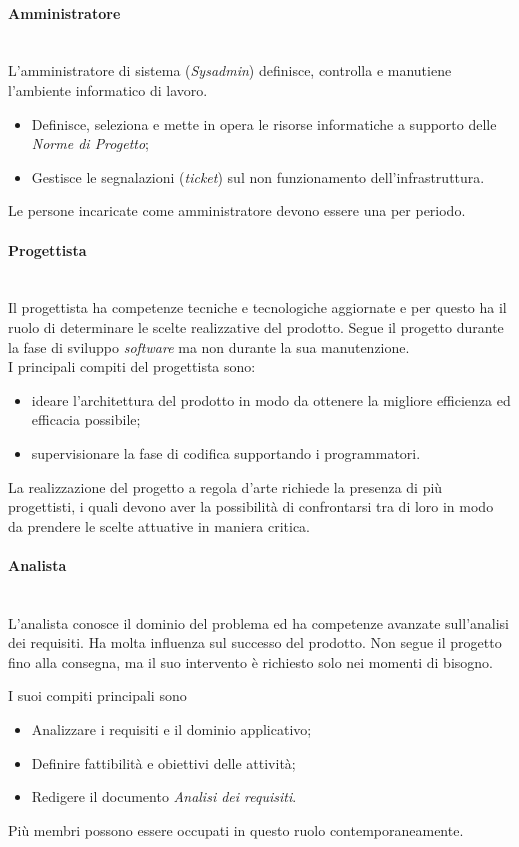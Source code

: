 \documentclass[10pt, letterpaper]{article}
\newcommand{\trisubsection}[1]{\paragraph{#1}\mbox{}\\}
\begin{document}
\label{sec:Amministratore}
\trisubsection{Amministratore}
L'amministratore di sistema (\textit{Sysadmin}) definisce, controlla e manutiene l'ambiente informatico di lavoro.
\begin{itemize}
    \item Definisce, seleziona e mette in opera le risorse informatiche a supporto delle \textit{Norme di Progetto};
    \item Gestisce le segnalazioni (\textit{ticket}) sul non funzionamento dell'infrastruttura.
\end{itemize}
Le persone incaricate come amministratore devono essere una per periodo.

\label{sec:Progettista}
\trisubsection{Progettista}
Il progettista ha competenze tecniche e tecnologiche aggiornate e per questo ha il ruolo di determinare le scelte realizzative del prodotto. Segue il progetto durante la fase di sviluppo \textit{software} ma non durante la sua manutenzione. \\

I principali compiti del progettista sono:
\begin{itemize}
    \item ideare l'architettura del prodotto in modo da ottenere la migliore efficienza ed efficacia possibile;
    \item supervisionare la fase di codifica supportando i programmatori.
\end{itemize}
La realizzazione del progetto a regola d'arte richiede la presenza di più progettisti, i quali devono aver la possibilità di confrontarsi tra di loro in modo da prendere le scelte attuative in maniera critica.

\label{sec:Analista}
\trisubsection{Analista}
L'analista conosce il dominio del problema ed ha competenze avanzate sull'analisi dei requisiti. Ha molta influenza sul successo del prodotto. Non segue il progetto fino alla consegna, ma il suo intervento è richiesto solo nei momenti di bisogno.

I suoi compiti principali sono
\begin{itemize}
    \item Analizzare i requisiti e il dominio applicativo;
    \item Definire fattibilità e obiettivi delle attività;
    \item Redigere il documento \textit{Analisi dei requisiti}.
\end{itemize}
Più membri possono essere occupati in questo ruolo contemporaneamente.
\end{document}
